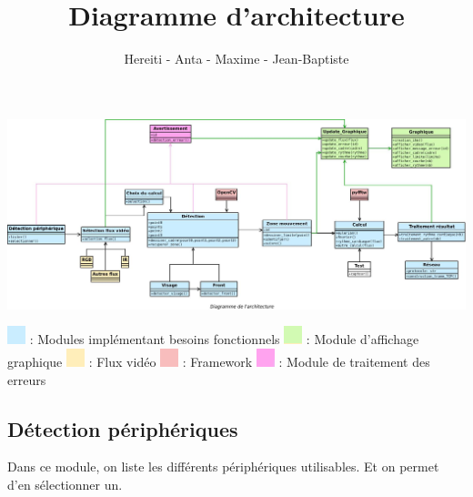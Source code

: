 \documentclass[12pt,a4paper]{article}
\title{Diagramme d'architecture}
\author{Hereiti \bsc{Hatitio} - Anta \bsc{Mbaye} - Maxime \bsc{Vincent} - Jean-Baptiste \bsc{Rey}}
\begin{document}
\maketitle

\newpage
\vspace*{-1in}
\vspace*{-\the\hoffset}
\thispagestyle{empty}
\includegraphics[scale=0.4,angle=90]{archi2.jpeg}
\begin{center}

\end{center}
\includegraphics[scale=0.5]{bleu.png} : Modules implémentant besoins fonctionnels\newline
\includegraphics[scale=0.5]{vert.png} : Module d'affichage graphique\newline
\includegraphics[scale=0.5]{orange.png} : Flux vidéo\newline
\includegraphics[scale=0.5]{rouge.png} : Framework\newline
\includegraphics[scale=0.5]{rose.png} :  Module de traitement des erreurs

\subsection*{Détection périphériques}

Dans ce module, on liste les différents périphériques utilisables. Et on permet d'en sélectionner un.
\end{document}
